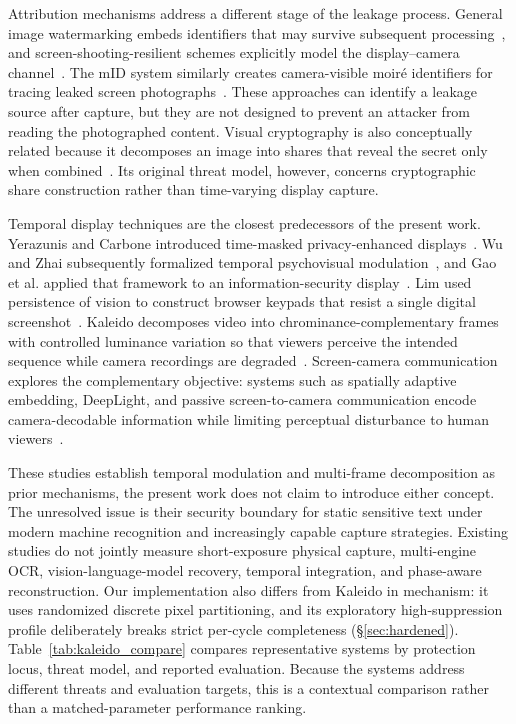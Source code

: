 \documentclass{ieeeaccess}
\begin{document}
Attribution mechanisms address a different stage of the leakage process. General image watermarking embeds identifiers that may survive subsequent processing~\cite{b_zhong2023}, and screen-shooting-resilient schemes explicitly model the display--camera channel~\cite{b_fang2019}. The mID system similarly creates camera-visible moir\'{e} identifiers for tracing leaked screen photographs~\cite{b_mid2021}. These approaches can identify a leakage source after capture, but they are not designed to prevent an attacker from reading the photographed content. Visual cryptography is also conceptually related because it decomposes an image into shares that reveal the secret only when combined~\cite{b_naor1994}. Its original threat model, however, concerns cryptographic share construction rather than time-varying display capture.

Temporal display techniques are the closest predecessors of the present work. Yerazunis and Carbone introduced time-masked privacy-enhanced displays~\cite{b_yerazunis2001}. Wu and Zhai subsequently formalized temporal psychovisual modulation~\cite{b_wu2013}, and Gao et al. applied that framework to an information-security display~\cite{b_gao2014}. Lim used persistence of vision to construct browser keypads that resist a single digital screenshot~\cite{b_lim2007}. Kaleido decomposes video into chrominance-complementary frames with controlled luminance variation so that viewers perceive the intended sequence while camera recordings are degraded~\cite{b_kaleido2015}. Screen-camera communication explores the complementary objective: systems such as spatially adaptive embedding, DeepLight, and passive screen-to-camera communication encode camera-decodable information while limiting perceptual disturbance to human viewers~\cite{b_nguyen2016,b_tran2021,b_ghiasi2024}.

These studies establish temporal modulation and multi-frame decomposition as prior mechanisms, the present work does not claim to introduce either concept. The unresolved issue is their security boundary for static sensitive text under modern machine recognition and increasingly capable capture strategies. Existing studies do not jointly measure short-exposure physical capture, multi-engine OCR, vision-language-model recovery, temporal integration, and phase-aware reconstruction. Our implementation also differs from Kaleido in mechanism: it uses randomized discrete pixel partitioning, and its exploratory high-suppression profile deliberately breaks strict per-cycle completeness (\S\ref{sec:hardened}). Table~\ref{tab:kaleido_compare} compares representative systems by protection locus, threat model, and reported evaluation. Because the systems address different threats and evaluation targets, this is a contextual comparison rather than a matched-parameter performance ranking.
\end{document}
